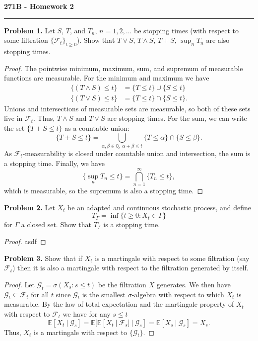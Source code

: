 \documentclass[11pt,letterpaper]{report}
\newcommand{\mcal}[1]{\mathcal{#1}}
\newcommand{\rationals}{\mathbb{Q}}
\newcommand{\E}{\mathbb{E}}
\begin{document}
\begin{center}
{\bf \Large 271B - Homework 2}
\vspace{0.2cm}
\hrule
\end{center}

\noindent\textbf{Problem 1. }
Let $S$, $T$, and $T_n$, $n = 1, 2, \ldots$ be stopping times (with respect to some filtration $\{\mcal{F}_t\}_{t\geq 0}$). Show that $T\lor S$, $T\land S$, $T+S$, $\sup_n T_n$ are also stopping times.
\begin{proof}
	The pointwise minimum, maximum, sum, and supremum of measurable functions are measurable. For the minimum and maximum we have
	\begin{align*}
		\{(T\land S) \leq t\} &= \{T\leq t\} \cup \{S\leq t\}\\
		\{(T\lor S) \leq t\} &= \{T\leq t\} \cap \{S\leq t\}.
	\end{align*}
	Unions and intersections of measurable sets are measurable, so both of these sets live in $\mcal{F}_t$. Thus, $T\land S$ and $T\lor S$ are stopping times. For the sum, we can write the set $\{T+S \leq t\}$ as a countable union:
	\[
	\{T+S \leq t\} = \bigcup_{\alpha, \beta \in \rationals,\ \alpha+\beta \leq t}\{T\leq \alpha\} \cap \{S\leq \beta\}.
	\]
	As $\mcal{F}_t$-measurability is closed under countable union and intersection, the sum is a stopping time. Finally, we have
	\[
	\{\sup_n T_n \leq t\} = \bigcap_{n=1}^\infty \{T_n \leq t\},
	\]
	which is measurable, so the supremum is also a stopping time.
\end{proof}

\noindent\textbf{Problem 2. }
Let $X_t$ be an adapted and continuous stochastic process, and define
\[
T_\Gamma = \inf\{t\geq 0: X_t\in \Gamma\}
\]
for $\Gamma$ a closed set. Show that $T_\Gamma$ is a stopping time.
\begin{proof}
	asdf
\end{proof}

\noindent\textbf{Problem 3. }
Show that if $X_t$ is a martingale with respect to some filtration (say $\mcal{F}_t$) then it is also a martingale with respect to the filtration generated by itself.
\begin{proof}
	Let $\mcal{G}_t = \sigma(X_s: s\leq t)$ be the filtration $X$ generates. We then have $\mcal{G}_t \subseteq \mcal{F}_t$ for all $t$ since $\mcal{G}_t$ is the smallest $\sigma$-algebra with respect to which $X_t$ is measurable. By the law of total expectation and the martingale property of $X_t$ with respect to $\mcal{F}_t$ we have for any $s\leq t$
	\[
	\E[X_t\ |\ \mcal{G}_s] = \E[\E[X_t\ |\ \mcal{F}_s]\ |\ \mcal{G}_s] = \E[X_s\ |\ \mcal{G}_s] = X_s.
	\]
	Thus, $X_t$ is a martingale with respect to $\{\mcal{G}_t\}$.
\end{proof}
\end{document}
